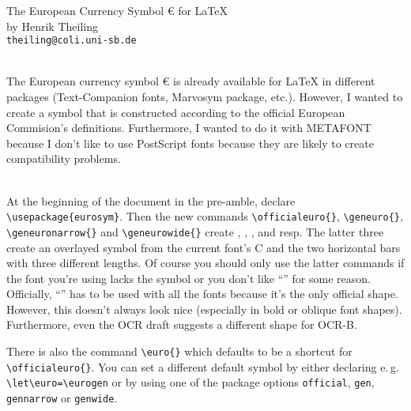 \documentclass[10pt]{article}
\renewcommand\section[1]{%
 \par\vspace{0.5\baselineskip}%
 \noindent{\bfseries\large #1}%
 \\[0.5\baselineskip]}
\begin{document}
\begin{centering}
\LARGE{The European Currency Symbol \euro{} for \LaTeX}\\
\vspace*{4mm}
\large{by Henrik Theiling}\\
\large{\tt theiling@coli.uni-sb.de}\\
\end{centering}
\vspace*{2\baselineskip}

\section{Why?}
The European currency symbol \euro{} is already available for \LaTeX{}
in different packages (Text-Companion fonts, Marvosym package,
etc.{}).  However, I wanted to create a symbol that is constructed
according to the official European Commision's definitions.
Furthermore, I wanted to do it with {\sf METAFONT} because I don't
like to use PostScript fonts because they are likely to create
compatibility problems.

\section{Usage}
At the beginning of the document in the pre-amble, declare
\verb:\usepackage{eurosym}:.  Then the new commands
\verb:\officialeuro{}:, \verb:\geneuro{}:, \verb:\geneuronarrow{}: and
\verb:\geneurowide{}: create \officialeuro{}, \geneuro{},
\geneuronarrow{}, and \geneurowide{} resp.  The latter three create an
overlayed symbol from the current font's C and the two horizontal bars
with three different lengths.  Of course you should only use the
latter commands if the font you're using lacks the \officialeuro{}
symbol or you don't like ``\officialeuro{}'' for some reason.
Officially, ``\officialeuro{}'' has to be used with all the fonts
because it's the only official shape.  However, this doesn't always
look nice (especially in bold or oblique font shapes).  Furthermore,
even the OCR draft suggests a different shape for OCR-B.

There is also the command \verb:\euro{}: which defaults to be a
shortcut for \verb:\officialeuro{}:.  You can set a different default
symbol by either declaring e.\,g.{} \verb:\let\euro=\eurogen: or by
using one of the package options {\tt{}official}, {\tt{}gen},
{\tt{}gennarrow} or {\tt{}genwide}.
\end{document}
